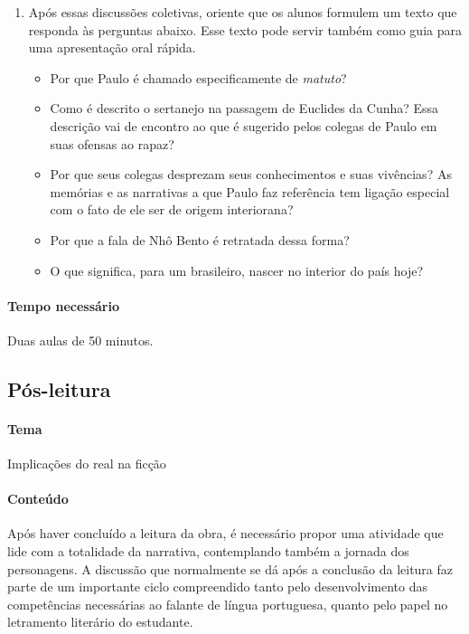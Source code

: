 \documentclass[12pt]{extarticle}
\begin{document}
\begin{enumerate}
\item Após essas discussões coletivas, oriente que os alunos formulem um
texto que responda às perguntas abaixo. Esse texto pode servir
também como guia para uma apresentação oral rápida.

\begin{itemize}
\item
  Por que Paulo é chamado especificamente de \emph{matuto}?
\item
  Como é descrito o sertanejo na passagem de Euclides da Cunha? Essa
  descrição vai de encontro ao que é sugerido pelos colegas de Paulo em
  suas ofensas ao rapaz?
\item
  Por que seus colegas desprezam seus conhecimentos e suas vivências? As
  memórias e as narrativas a que Paulo faz referência tem ligação
  especial com o fato de ele ser de origem interiorana?
\item
  Por que a fala de Nhô Bento é retratada dessa forma?
\item
  O que significa, para um brasileiro, nascer no interior do país hoje?
\end{itemize}
\end{enumerate}

\paragraph{Tempo necessário} Duas aulas de 50 minutos.

\subsection{Pós-leitura}

\paragraph{Tema} Implicações do real na ficção


\paragraph{Conteúdo}
Após haver concluído a leitura da obra, é necessário propor uma
atividade que lide com a totalidade da narrativa, contemplando também
a jornada dos personagens. A discussão que normalmente se dá após a
conclusão da leitura faz parte de um importante ciclo compreendido
tanto pelo desenvolvimento das competências necessárias ao falante de
língua portuguesa, quanto pelo papel no letramento literário do
estudante.
\end{document}
